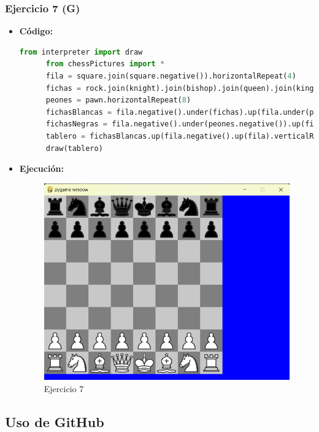 \documentclass{article}
\begin{document}
  \subsubsection{Ejercicio 7 (G)}
  \begin{itemize}
    \item \textbf{Código:}
    \begin{lstlisting}[language=Python, caption=Ejercicio2g]
      from interpreter import draw
      from chessPictures import *
      fila = square.join(square.negative()).horizontalRepeat(4)
      fichas = rock.join(knight).join(bishop).join(queen).join(king).join(bishop).join(knight).join(rock)
      peones = pawn.horizontalRepeat(8)
      fichasBlancas = fila.negative().under(fichas).up(fila.under(peones)) 
      fichasNegras = fila.negative().under(peones.negative()).up(fila.under(fichas.negative()))
      tablero = fichasBlancas.up(fila.negative().up(fila).verticalRepeat(2)).up(fichasNegras)
      draw(tablero)
    \end{lstlisting}
    \item \textbf{Ejecución:}  
    \begin{figure}[H]
      \centering
      \includegraphics[width=1\textwidth, keepaspectratio]{img/ejercicio2g.png}
      \caption{Ejercicio 7}
    \end{figure}
  \end{itemize}
  \newpage

	
  \subsection{Uso de GitHub}
  
\end{document}
